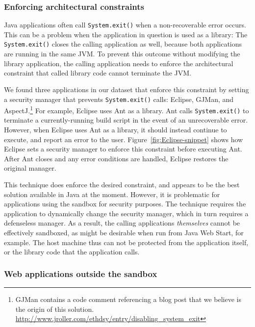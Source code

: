 \documentclass{sig-alternate}
\begin{document}
\subsubsection{Enforcing architectural constraints}

Java applications often call \texttt{System.exit()} when a non-recoverable
error occurs. This can be a problem when the application in question is 
used as a library: The \texttt{System.exit()} closes the calling
application as well, because both applications
are running in the same JVM. 
To prevent this outcome without modifying the library application,
the calling application needs to enforce the architectural constraint
that called library code cannot terminate the JVM. 

We found three applications in our dataset that 
enforce this constraint by setting a security manager
that prevents \texttt{System.exit()} calls:
Eclipse, GJMan, and AspectJ.\footnote{%
GJMan contains a code comment referencing a
blog post that we believe is the origin of this solution. \url{http://www.jroller.com/ethdsy/entry/disabling_system_exit}}
For example, Eclipse uses Ant as a library.  Ant calls \texttt{System.exit()} to
terminate a currently-running build script in the event of an unrecoverable
error.  However, when Eclipse uses Ant as a library, it
should instead continue to execute, and report an error to the user.
Figure~\ref{fig:Eclipse-snippet} shows
how Eclipse sets a security manager to enforce this constraint
before executing Ant. After Ant closes and any error conditions
are handled, Eclipse restores the original manager.

This technique does enforce the
desired constraint, and appears to be the best solution available
in Java at the moment.  However, it is problematic for applications using the sandbox for security purposes.  The technique requires
the application to dynamically change the security manager, which in turn requires a
defenseless manager.  As a result, the calling applications \emph{themselves} cannot be
effectively sandboxed, as might be desirable when run from Java Web Start, for
example. The host machine thus can not be protected from the application itself, or the library code that the application calls.

\subsubsection{Web applications outside the sandbox}\label{sub:Reducing-Web-Application-Complexity}
\end{document}

